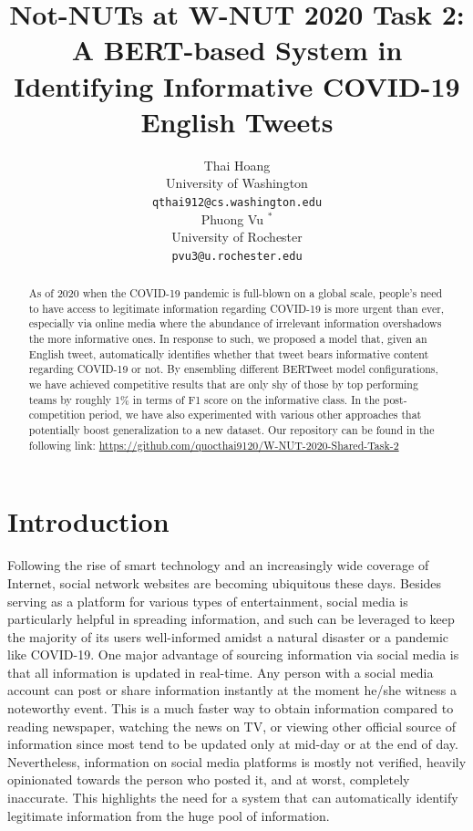 \documentclass[11pt,a4paper]{article}
\title{Not-NUTs at W-NUT 2020 Task 2: A BERT-based System in Identifying Informative COVID-19 English Tweets}
\author{Thai Hoang \\
  University of Washington\\
  \texttt{qthai912@cs.washington.edu} \\\And
  Phuong Vu $^*$ \\
  University of Rochester\\
  \texttt{pvu3@u.rochester.edu} \\}
\date{}
\begin{document}
\maketitle
\def\thefootnote{*}

\begin{abstract}

As of 2020 when the COVID-19 pandemic is full-blown on a global scale, people's need to have access to legitimate information regarding COVID-19 is more urgent than ever, especially via online media where the abundance of irrelevant information overshadows the more informative ones. In response to such, we proposed a model that, given an English tweet, automatically identifies whether that tweet bears informative content regarding COVID-19 or not. By ensembling different BERTweet model configurations, we have achieved competitive results that are only shy of those by top performing teams by roughly 1\% in terms of F1 score on the informative class. In the post-competition period, we have also experimented with various other approaches that potentially boost generalization to a new dataset. Our repository can be found in the following link:
\url{https://github.com/quocthai9120/W-NUT-2020-Shared-Task-2}

\end{abstract}

\section{Introduction}

Following the rise of smart technology and an increasingly wide coverage of Internet, social network websites are becoming ubiquitous these days. Besides serving as a platform for various types of entertainment, social media is particularly helpful in spreading information, and such can be leveraged to keep the majority of its users well-informed amidst a natural disaster or a pandemic like COVID-19. One major advantage of sourcing information via social media is that all information is updated in real-time. Any person with a social media account can post or share information instantly at the moment he/she witness a noteworthy event. This is a much faster way to obtain information compared to reading newspaper, watching the news on TV, or viewing other official source of information since most tend to be updated only at mid-day or at the end of day. Nevertheless, information on social media platforms is mostly not verified, heavily opinionated towards the person who posted it, and at worst, completely inaccurate. This highlights the need for a system that can automatically identify legitimate information from the huge pool of information. 
\end{document}
